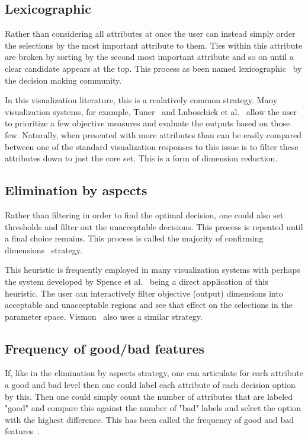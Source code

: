\subsection{Lexicographic}\label{lexicographic}

Rather than considering all attributes at once the user can instead simply
order the selections by the most important attribute to them. Ties within this
attribute are broken by sorting by the second most important attribute and so
on until a clear candidate appears at the top. This process as been named
lexicographic~ by the decision making community.

In this visualization literature, this is a realatively common strategy.
Many visualization systems, for example, Tuner~\cite{Torsney-Weir:2011} and
Luboschick et al.~\citep{Luboschik:2014} allow the user to prioritize a few
objective measures and evaluate the outputs based on those few. Naturally,
when presented with more attributes than can be easily compared between
one of the standard visualization responses to this issue is to filter
these attributes down to just the core set. This is a form of dimension 
reduction.

\subsection{Elimination by aspects}\label{elimination-by-aspects}

Rather than filtering in order to find the optimal decision, one could
also set thresholds and filter out the unacceptable decisions. This process
is repeated until a final choice remains. This process is called
the majority of confirming dimensions~ strategy. 

This heuristic is frequently employed in many visualization systems with
perhaps the system developed by Spence et al.~\citep{Spence:1995} being a
direct application of this heuristic. The user can interactively filter
objective (output) dimensions into acceptable and unacceptable regions and
see that effect on the selections in the parameter space. 
Vismon~ also uses a similar strategy.

\subsection{Frequency of good/bad
features}\label{frequency-of-goodbad-features}

If, like in the elimination by aspects strategy, one can articulate for
each attribute a good and bad level then one could label each attribute
of each decision option by this. Then one could simply count the number of
attributes that are labeled "good" and compare this against the number of
"bad" labels and select the option with the highest difference. This has
been called the frequency of good and bad features~.

